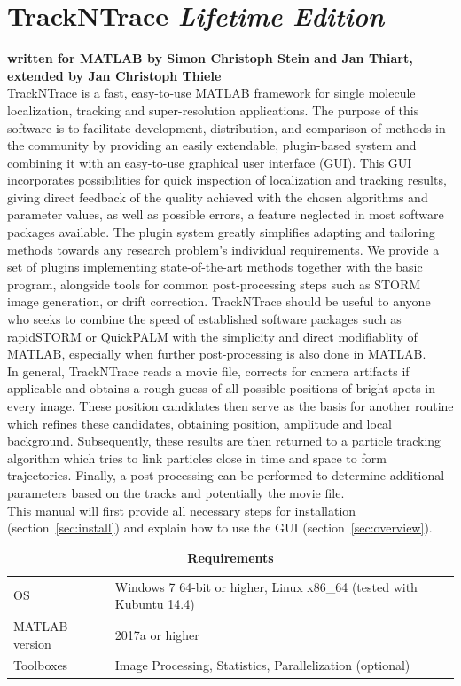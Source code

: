 \documentclass[11pt,onside]{report}
\numberwithin{equation}{chapter}
\begin{document}
\chapter*{TrackNTrace \emph{Lifetime Edition}}
\vspace*{-30pt}\textbf{written for MATLAB by Simon Christoph Stein and Jan Thiart, extended by Jan Christoph Thiele}\\ [10pt]
TrackNTrace is a fast, easy-to-use MATLAB framework for single molecule localization, tracking and super-resolution applications. The purpose of this software is to facilitate development, distribution, and comparison of methods in the community by providing an easily extendable, plugin-based system and combining it with an easy-to-use graphical user interface (GUI). This GUI incorporates possibilities for quick inspection of localization and tracking results, giving direct feedback of the quality achieved with the chosen algorithms and parameter values, as well as possible errors, a feature neglected in most software packages available. The plugin system greatly simplifies adapting and tailoring methods towards any research problem's individual requirements. We provide a set of plugins implementing state-of-the-art methods together with the basic program, alongside tools for common post-processing steps such as STORM image generation, or drift correction. TrackNTrace should be useful to anyone who seeks to combine the speed of established software packages such as rapidSTORM or QuickPALM with the simplicity and direct modifiablity of MATLAB, especially when further post-processing is also done in MATLAB.\\
  
In general, TrackNTrace reads a movie file, corrects for camera artifacts if applicable and obtains a rough guess of all possible positions of bright spots in every image. These position candidates then serve as the basis for another routine which refines these candidates, obtaining position, amplitude and local background. Subsequently, these results are then returned to a particle tracking algorithm which tries to link particles close in time and space to form trajectories. Finally, a post-processing can be performed to determine additional parameters based on the tracks and potentially the movie file.
\\[10pt]
This manual will first provide all necessary steps for installation (section~\ref{sec:install}) and explain how to use the GUI (section~\ref{sec:overview}). 
\begin{table}[!h]
\centering
\caption*{\textbf{Requirements}}
\label{tab:requirements}
\begin{tabular}{p{} p{}}
\toprule
OS & Windows 7 64-bit or higher, Linux x86\_64 (tested with Kubuntu 14.4) \\[5pt]
MATLAB version & 2017a or higher\\[5pt]
Toolboxes & Image Processing, Statistics, Parallelization (optional) \\[0pt]
\bottomrule
\end{tabular}
\end{table}
\end{document}
